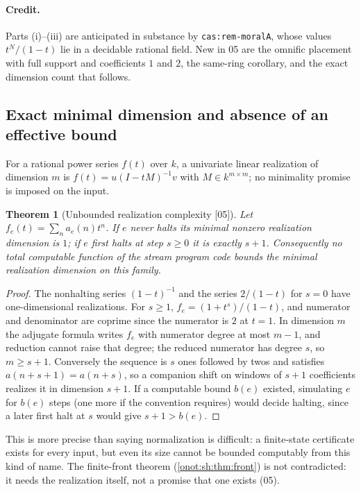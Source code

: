 \documentclass[11pt,oneside]{article}
\numberwithin{equation}{section}
\newtheorem{theorem}{Theorem}[section]
\theoremstyle{definition}
\theoremstyle{remark}
\newcommand{\src}[1]{\textup{\textsf{\small[#1]}}}
\newcommand{\replabel}[1]{\nolinkurl{#1}}
\begin{document}
\paragraph{Credit.} Parts (i)--(iii) are anticipated in substance by
\replabel{cas:rem-moralA}, whose values $t^N/(1-t)$ lie in a decidable rational
field. New in 05 are the omnific placement with full support and coefficients $1$
and $2$, the same-ring corollary, and the exact dimension count that follows.

\subsection{Exact minimal dimension and absence of an effective bound}

For a rational power series $f(t)$ over $k$, a univariate linear realization of
dimension $m$ is $f(t)=u(I-tM)^{-1}v$ with $M\in k^{m\times m}$; no minimality
promise is imposed on the input.

\begin{theorem}[Unbounded realization complexity \src{05}]\label{onot:neg:thm:statebound}
Let $f_e(t)=\sum_na_e(n)t^n$. If $e$ never halts its minimal nonzero realization
dimension is $1$; if $e$ first halts at step $s\ge0$ it is exactly $s+1$.
Consequently no total computable function of the stream program code bounds the
minimal realization dimension on this family.
\end{theorem}
\begin{proof}
The nonhalting series $(1-t)^{-1}$ and the series $2/(1-t)$ for $s=0$ have
one-dimensional realizations. For $s\ge1$, $f_e=(1+t^s)/(1-t)$, and numerator and
denominator are coprime since the numerator is $2$ at $t=1$. In dimension $m$ the
adjugate formula writes $f_e$ with numerator degree at most $m-1$, and reduction
cannot raise that degree; the reduced numerator has degree $s$, so $m\ge s+1$.
Conversely the sequence is $s$ ones followed by twos and satisfies
$a(n+s+1)=a(n+s)$, so a companion shift on windows of $s+1$ coefficients realizes
it in dimension $s+1$. If a computable bound $b(e)$ existed, simulating $e$ for
$b(e)$ steps (one more if the convention requires) would decide halting, since a
later first halt at $s$ would give $s+1>b(e)$.
\end{proof}

This is more precise than saying normalization is difficult: a finite-state
certificate exists for every input, but even its size cannot be bounded computably
from this kind of name. The finite-front theorem (\cref{onot:sh:thm:front}) is not
contradicted: it needs the realization itself, not a promise that one exists (05).
\end{document}
